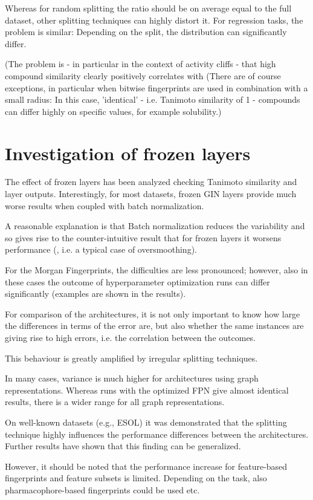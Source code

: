 Whereas for random splitting the ratio should be on average equal to the full dataset, other splitting techniques can highly distort it.
For regression tasks, the problem is similar: Depending on the split, the distribution can significantly differ.

(The problem is - in particular in the context of activity cliffs - that high compound similarity clearly positively correlates with 
(There are of course exceptions, in particular when bitwise fingerprints are used in combination with a small radius: In this case, 'identical' - i.e. Tanimoto similarity of 1 - compounds can differ highly on specific values, for example solubility.)


\section{Investigation of frozen layers}

The effect of frozen layers has been analyzed checking Tanimoto similarity and layer outputs. Interestingly, for most datasets, frozen GIN layers provide much worse results when coupled with batch normalization.


A reasonable explanation is that Batch normalization reduces the variability and so gives rise to the counter-intuitive result that for frozen layers it worsens performance (, i.e. a typical case of oversmoothing).



For the Morgan Fingerprints, the difficulties are less pronounced; however, also in these cases the outcome of hyperparameter optimization runs can differ significantly (examples are shown in the results).



For comparison of the architectures, it is not only important to know how large the differences in terms of the error are, but also whether the same instances are giving rise to high errors, i.e. the correlation between the outcomes.

This behaviour is greatly amplified by irregular splitting techniques.

In many cases, variance is much higher for architectures using graph representations. Whereas runs with the optimized FPN give almost identical results, there is a wider range for all graph representations.

On well-known datasets (e.g., ESOL) it was demonstrated that the splitting technique highly influences the performance differences between the architectures. Further results have shown that this finding can be generalized.


However, it should be noted that the performance increase for feature-based fingerprints and feature subsets is limited. Depending on the task, also pharmacophore-based fingerprints could be used etc.
